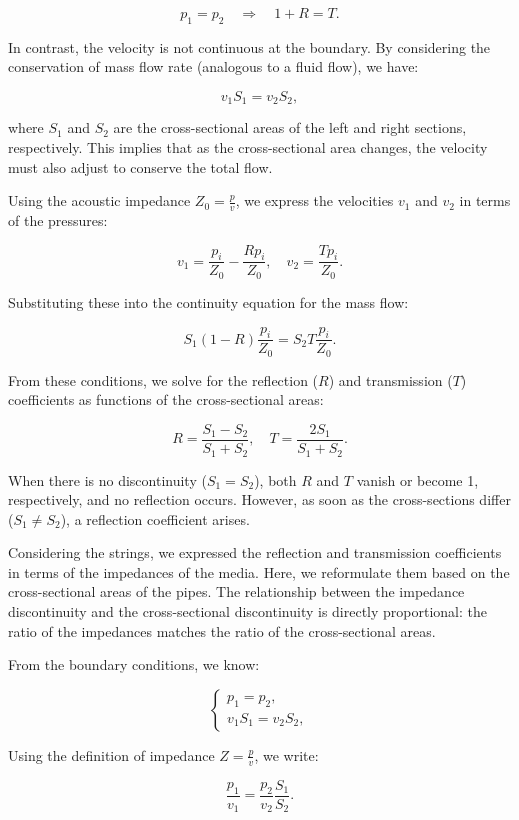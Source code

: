 \documentclass[a4paper]{article}
\begin{document}
\[
p_1 = p_2 \quad \Rightarrow \quad 1 + R = T.
\]

In contrast, the velocity is not continuous at the boundary. By considering the conservation of mass flow rate (analogous to a fluid flow), we have:

\[
v_1 S_1 = v_2 S_2,
\]

where \( S_1 \) and \( S_2 \) are the cross-sectional areas of the left and right sections, respectively. This implies that as the cross-sectional area changes, the velocity must also adjust to conserve the total flow. 

Using the acoustic impedance \( Z_0 = \frac{p}{v} \), we express the velocities \( v_1 \) and \( v_2 \) in terms of the pressures:

\[
v_1 = \frac{p_i}{Z_0} - \frac{R p_i}{Z_0}, \quad v_2 = \frac{T p_i}{Z_0}.
\]

Substituting these into the continuity equation for the mass flow:

\[
S_1 (1 - R) \frac{p_i}{Z_0} = S_2 T \frac{p_i}{Z_0}.
\]

From these conditions, we solve for the reflection (\( R \)) and transmission (\( T \)) coefficients as functions of the cross-sectional areas:

\[
R = \frac{S_1 - S_2}{S_1 + S_2}, \quad T = \frac{2 S_1}{S_1 + S_2}.
\]

When there is no discontinuity (\( S_1 = S_2 \)), both \( R \) and \( T \) vanish or become 1, respectively, and no reflection occurs. However, as soon as the cross-sections differ (\( S_1 \neq S_2 \)), a reflection coefficient arises. 


Considering the strings, we expressed the reflection and transmission coefficients in terms of the impedances of the media. Here, we reformulate them based on the cross-sectional areas of the pipes. The relationship between the impedance discontinuity and the cross-sectional discontinuity is directly proportional: the ratio of the impedances matches the ratio of the cross-sectional areas.

From the boundary conditions, we know:

\[
\begin{cases}
p_1 = p_2, \\
v_1 S_1 = v_2 S_2,
\end{cases}
\]


Using the definition of impedance \( Z = \frac{p}{v} \), we write:

\[
\frac{p_1}{v_1} = \frac{p_2}{v_2} \frac{S_1}{S_2}.
\]
\end{document}
